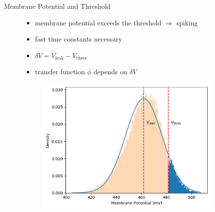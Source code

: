 \documentclass[12pt, aspectratio=169]{beamer}
\begin{document}
\begin{frame}{Membrane Potential and Threshold}
    \begin{figure}[!htb]
            \begin{itemize}
                \item membrane potential exceeds the threshold $\Rightarrow$ spiking
                \item fast time constants necessary
                \item $\delta V = V_{\text{leak}} - V_{\text{thres}}$
                \item transfer function $\phi$ depends on $\delta V$
            \end{itemize}
      	\endminipage\hfill
      	    \centering
      	    \vspace{20pt}
            \begin{figure}
                \includegraphics[scale=0.5]{mfp/activation_function_vmem_distr_with_thres.png}
                \label{membrane_potential}
            \end{figure}
        \endminipage\hfill
    \end{figure}
\end{frame}
\end{document}
